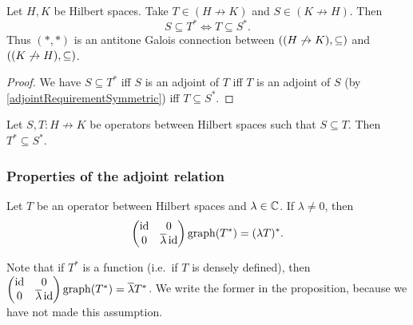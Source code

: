 \begin{proposition} \label{HilbertAdjointGaloisConnection}
Let $H, K$ be Hilbert spaces. Take $T\in (H\not\to K)$ and $S\in (K\not\to H)$. Then
\[ S \subseteq T^* \iff T\subseteq S^*. \]
Thus $(*,*)$ is an antitone Galois connection between $\left( (H\not\to K), \subseteq \right)$ and $\left( (K\not\to H), \subseteq \right)$.
\end{proposition}
\begin{proof}
We have $S \subseteq T^*$ iff $S$ is an adjoint of $T$ iff $T$ is an adjoint of $S$ (by \ref{adjointRequirementSymmetric}) iff $T\subseteq S^*$.
\end{proof}
\begin{corollary} \label{HilbertAdjointAntitone}
Let $S,T: H\not\to K$ be operators between Hilbert spaces such that $S\subseteq T$. Then $T^* \subseteq S^*$.
\end{corollary}
\subsubsection{Properties of the adjoint relation}

\begin{proposition}
Let $T$ be an operator between Hilbert spaces and $\lambda\in\mathbb{C}$. If $\lambda \neq 0$, then
\[ \begin{pmatrix}
\operatorname{id} & 0 \\ 0 & \overline{\lambda}\operatorname{id}
\end{pmatrix} \operatorname{graph}(T^*) = (\lambda T)^*. \]
\end{proposition}
Note that if $T^*$ is a function (i.e.\ if $T$ is densely defined), then $\begin{pmatrix}
\operatorname{id} & 0 \\ 0 & \overline{\lambda}\operatorname{id}
\end{pmatrix} \operatorname{graph}(T^*) = \overline{\lambda}T^*$. We write the former in the proposition, because we have not made this assumption.

